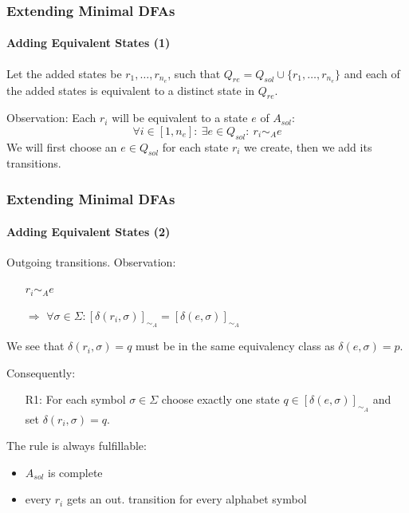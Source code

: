 \documentclass[handout,10pt]{beamer}%
\newcommand{\nEQ}{{n_e}}
\begin{document}
	\begin{frame}
		\frametitle{Extending Minimal DFAs}
		\framesubtitle{Adding Equivalent States (1)}
		Let the added states be $r_1,\ldots,r_\nEQ$, such that $Q_{re} = Q_{sol} \cup \{r_1,\ldots,r_\nEQ\}$ and each of the added states is equivalent to a distinct state in $Q_{re}$.
		
		\vspace{0.2cm}
		Observation: Each $r_i$ will be equivalent to a state $e$ of $A_{sol}$:
		\[
		\forall i \in [1,\nEQ] \colon\ \exists e \in Q_{sol}\colon\ r_i \sim_A e
		\]
		We will first choose an $e\in Q_{sol}$ for each state $r_i$ we create, then we add its transitions.
	
	\end{frame}

	\begin{frame}
		\frametitle{Extending Minimal DFAs}
		\framesubtitle{Adding Equivalent States (2)}
		
		Outgoing transitions. Observation:
		\begin{itemize}
			\item[] $r_i \sim_A e$
			
			\item[$\Rightarrow$] $\forall \sigma \in \Sigma \colon [\delta(r_i, \sigma)]_{\sim_A} = [\delta(e, \sigma)]_{\sim_A}$
		\end{itemize}
	
		\vspace{0.2cm}
		We see that $\delta(r_i, \sigma) = q$ must be in the same equivalency class as $\delta(e, \sigma) = p$.
		
		\vspace{0.2cm}
		Consequently:
		\begin{itemize}
			\item[R1:] For each symbol $\sigma \in \Sigma$ choose exactly one state $q\in[\delta(e, \sigma)]_{\sim_A}$ and set $\delta(r_i, \sigma) = q$.
		\end{itemize}
	
		\vspace{0.2cm}
		The rule is always fulfillable:
		\begin{itemize}
			\item $A_{sol}$ is complete
			\item every $r_i$ gets an out. transition for every alphabet symbol
		\end{itemize}
	
	\end{frame}
\end{document}
